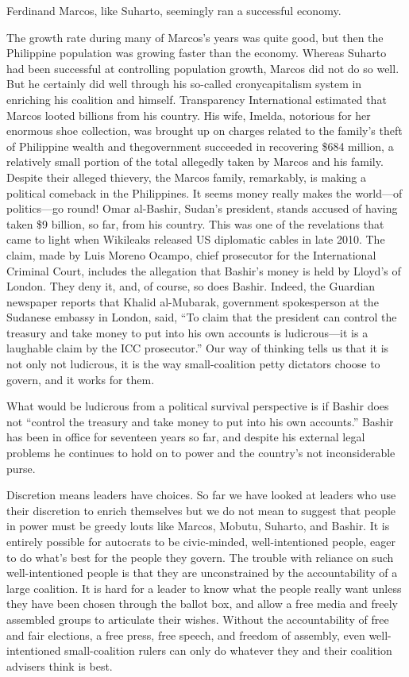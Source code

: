 \documentclass[10pt]{article}
\begin{document}
{\large Ferdinand Marcos, like Suharto, seemingly ran a successful economy.}

{\large The growth rate during many of Marcos's years was quite good, but then
the Philippine population was growing faster than the economy. Whereas Suharto
had been successful at controlling population growth, Marcos did not do so well.
But he certainly did well through his so-called cronycapitalism system in
enriching his coalition and himself. Transparency International estimated that
Marcos looted billions from his country. His wife, Imelda, notorious for her
enormous shoe collection, was brought up on charges related to the family's theft
of Philippine wealth and thegovernment succeeded in recovering \$684 million, a
relatively small portion of the total allegedly taken by Marcos and his family.
Despite their alleged thievery, the Marcos family, remarkably, is making a
political comeback in the Philippines. It seems money really makes the world---of
politics---go round! Omar al-Bashir, Sudan's president, stands accused of having
taken \$9 billion, so far, from his country. This was one of the revelations that
came to light when Wikileaks released US diplomatic cables in late 2010. The
claim, made by Luis Moreno Ocampo, chief prosecutor for the International
Criminal Court, includes the allegation that Bashir's money is held by Lloyd's of
London. They deny it, and, of course, so does Bashir. Indeed, the Guardian
newspaper reports that Khalid al-Mubarak, government spokesperson at the Sudanese
embassy in London, said, ``To claim that the president can control the treasury
and take money to put into his own accounts is ludicrous---it is a laughable
claim by the ICC prosecutor.'' Our way of thinking tells us that it is not only
not ludicrous, it is the way small-coalition petty dictators choose to govern,
and it works for them.}

{\large What would be ludicrous from a political survival perspective is if
Bashir does not ``control the treasury and take money to put into his own
accounts.'' Bashir has been in office for seventeen years so far, and despite his
external legal problems he continues to hold on to power and the country's not
inconsiderable purse.}

{\large Discretion means leaders have choices. So far we have looked at leaders
who use their discretion to enrich themselves but we do not mean to suggest that
people in power must be greedy louts like Marcos, Mobutu, Suharto, and Bashir. It
is entirely possible for autocrats to be civic-minded, well-intentioned people,
eager to do what's best for the people they govern. The trouble with reliance on
such well-intentioned people is that they are unconstrained by the accountability
of a large coalition. It is hard for a leader to know what the people really want
unless they have been chosen through the ballot box, and allow a free media and
freely assembled groups to articulate their wishes. Without the accountability of
free and fair elections, a free press, free speech, and freedom of assembly, even
well-intentioned small-coalition rulers can only do whatever they and their
coalition advisers think is best.}
\end{document}
